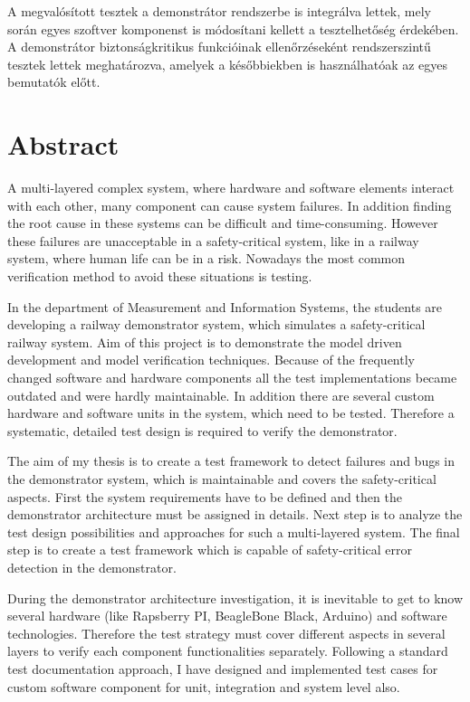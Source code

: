 A megvalósított tesztek a demonstrátor rendszerbe is integrálva lettek, mely során egyes szoftver komponenst is módosítani kellett a tesztelhetőség érdekében. A demonstrátor biztonságkritikus funkcióinak ellenőrzéseként rendszerszintű tesztek lettek meghatározva, amelyek a későbbiekben is használhatóak az egyes bemutatók előtt.

\vfill
\selectenglish


\chapter*{Abstract}

A multi-layered complex system, where hardware and software elements interact with each other, many component can cause system failures. In addition finding the root cause in these systems can be difficult and time-consuming. However these failures are unacceptable in a safety-critical system, like in a railway system, where human life can be in a risk. Nowadays the most common verification method to avoid these situations is testing.

In the department of Measurement and Information Systems, the students are developing a railway demonstrator system, which simulates a safety-critical railway system. Aim of this project is to demonstrate the model driven development and model verification techniques. Because of the frequently changed software and hardware components all the test implementations became outdated and were hardly maintainable. In addition there are several custom hardware and software units in the system, which need to be tested. Therefore a systematic, detailed test design is required to verify the demonstrator. 

The aim of my thesis is to create a test framework to detect failures and bugs in the demonstrator system, which is maintainable and covers the safety-critical aspects. First the system requirements have to be defined and then the demonstrator architecture must be assigned in details. Next step is to analyze the test design possibilities and approaches for such a multi-layered system. The final step is to create a test framework which is capable of safety-critical error detection in the demonstrator.

During the demonstrator architecture investigation, it is inevitable to get to know several hardware (like Rapsberry PI, BeagleBone Black, Arduino) and software technologies. Therefore the test strategy must cover different aspects in several layers to verify each component functionalities separately. Following a standard test documentation approach, I have designed and implemented test cases for custom software component for unit, integration and system level also.

